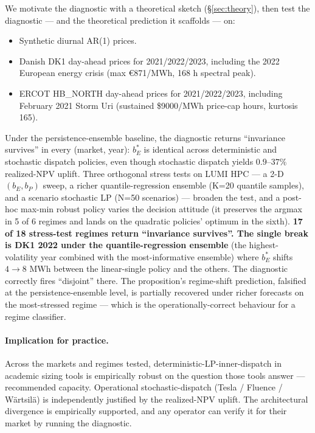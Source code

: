 \documentclass[11pt]{article}
\begin{document}
We motivate the diagnostic with a theoretical sketch (\S\ref{sec:theory}), then test the diagnostic --- and the theoretical prediction it scaffolds --- on:

\begin{itemize}
\item Synthetic diurnal AR(1) prices.
\item Danish DK1 day-ahead prices for 2021/2022/2023, including the 2022 European energy crisis (max \euro 871/MWh, 168 h spectral peak).
\item ERCOT HB\_NORTH day-ahead prices for 2021/2022/2023, including February 2021 Storm Uri (sustained \$9000/MWh price-cap hours, kurtosis 165).
\end{itemize}

Under the persistence-ensemble baseline, the diagnostic returns ``invariance survives'' in every (market, year): $b_E^*$ is identical across deterministic and stochastic dispatch policies, even though stochastic dispatch yields $0.9$--$37\%$ realized-NPV uplift. Three orthogonal stress tests on LUMI HPC --- a 2-D $(b_E, b_P)$ sweep, a richer quantile-regression ensemble (K=20 quantile samples), and a scenario stochastic LP (N=50 scenarios) --- broaden the test, and a post-hoc max-min robust policy varies the decision attitude (it preserves the argmax in 5 of 6 regimes and lands on the quadratic policies' optimum in the sixth). \textbf{17 of 18 stress-test regimes return ``invariance survives''. The single break is DK1 2022 under the quantile-regression ensemble} (the highest-volatility year combined with the most-informative ensemble) where $b_E^*$ shifts $4 \to 8$ MWh between the linear-single policy and the others. The diagnostic correctly fires ``disjoint'' there. The proposition's regime-shift prediction, falsified at the persistence-ensemble level, is partially recovered under richer forecasts on the most-stressed regime --- which is the operationally-correct behaviour for a regime classifier.

\paragraph{Implication for practice.} Across the markets and regimes tested, deterministic-LP-inner-dispatch in academic sizing tools is empirically robust on the question those tools answer --- recommended capacity. Operational stochastic-dispatch (Tesla / Fluence / W\"{a}rtsil\"{a}) is independently justified by the realized-NPV uplift. The architectural divergence is empirically supported, and any operator can verify it for their market by running the diagnostic.
\end{document}
